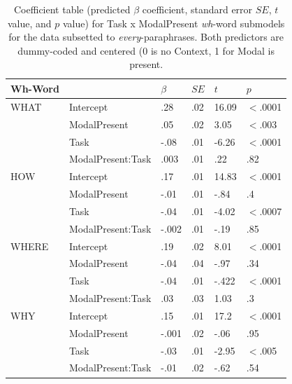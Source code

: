 \documentclass[12pt,letterpaper,table,svgnames,dvipsnames]{article}
\begin{document}
\begin{table}
\begin{center} 
\caption{Coefficient table (predicted $\beta$ coefficient, standard error $SE$, $t$ value, and $p$ value) for Task x ModalPresent \emph{wh}-word submodels for the data subsetted to \emph{every}-paraphrases. Both predictors are dummy-coded and centered (0 is no Context, 1 for Modal is present.} 
\label{sub-models_Task-every} 
\begin{tabular}{l|lllll} 
\toprule
Wh-Word & {} & $\beta$ & $SE$ & $t$ & $p$\\
\midrule
WHAT & Intercept & .28 & .02 & 16.09 & $<$.0001\\
{} & ModalPresent & .05 & .02 & 3.05 & $<$.003\\
{} & Task & -.08 & .01 & -6.26 & $<$.0001\\
{} & ModalPresent:Task & .003 & .01 & .22 & .82\\
\bottomrule
\toprule
HOW & Intercept & .17 & .01 & 14.83 & $<$.0001\\
{} & ModalPresent & -.01 & .01 & -.84 & .4\\
{} & Task & -.04 & .01 & -4.02 & $<$.0007\\
{} & ModalPresent:Task & -.002 & .01 & -.19 & .85\\
\toprule
WHERE & Intercept & .19 & .02 & 8.01 & $<$.0001\\
{} & ModalPresent & -.04 & .04 & -.97 & .34\\
{} & Task & -.04 & .01 & -.422 & $<$.0001\\
{} & ModalPresent:Task & .03 & .03 & 1.03 & .3\\
\bottomrule
\toprule
WHY & Intercept & .15 & .01 & 17.2 & $<$.0001\\
{} & ModalPresent & -.001 & .02 & -.06 & .95\\
{} & Task & -.03 & .01 & -2.95 & $<$.005\\
{} & ModalPresent:Task & -.01 & .02 & -.62 & .54\\

\end{tabular}
\end{center}
\end{table}
\end{document}
